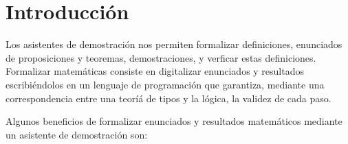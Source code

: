 \section*{Introducción}

Los asistentes de demostración nos permiten formalizar definiciones, enunciados
de proposiciones y teoremas, demostraciones, y verficar estas definiciones.
Formalizar matemáticas consiste en digitalizar enunciados y resultados
escribiéndolos en un lenguaje de programación que garantiza, mediante una
correspondencia entre una teoríá de tipos y la lógica, la validez de cada paso.

Algunos beneficios de formalizar enunciados y resultados matemáticos mediante un
asistente de demostración son:

\newpage

